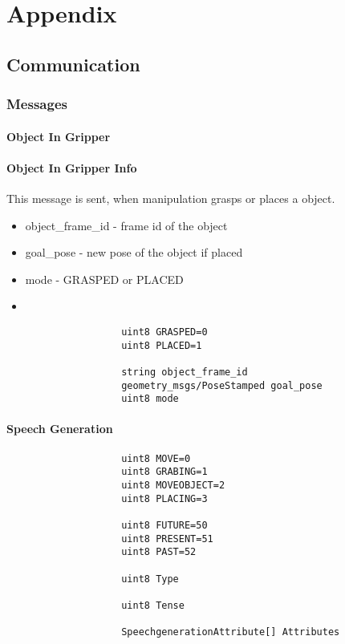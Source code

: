 \documentclass[main.tex]{subfiles}
\begin{document}
\begingroup

\renewcommand{\cleardoublepage}{}

\renewcommand{\clearpage}{}

	\chapter{Appendix}
		\section{Communication}
			\subsection{Messages}
			\label{msgs}
				\subsubsection{Object In Gripper}\label{msg_obj_in_gripper}
				\subsubsection{Object In Gripper Info}
				This message is sent, when manipulation grasps or places a object.
				\begin{itemize}
					\item object\_frame\_id - frame id of the object
					\item goal\_pose - new pose of the object if placed
					\item mode - GRASPED or PLACED
					\item
				\end{itemize}
					\begin{lstlisting}
					uint8 GRASPED=0
					uint8 PLACED=1
		
					string object_frame_id
					geometry_msgs/PoseStamped goal_pose
					uint8 mode
					\end{lstlisting}
				\subsubsection{Speech Generation}
					\begin{lstlisting}
					uint8 MOVE=0
					uint8 GRABING=1
					uint8 MOVEOBJECT=2
					uint8 PLACING=3
		
					uint8 FUTURE=50
					uint8 PRESENT=51
					uint8 PAST=52
		
					uint8 Type
		
					uint8 Tense
		
					SpeechgenerationAttribute[] Attributes
					\end{lstlisting}
\end{document}
